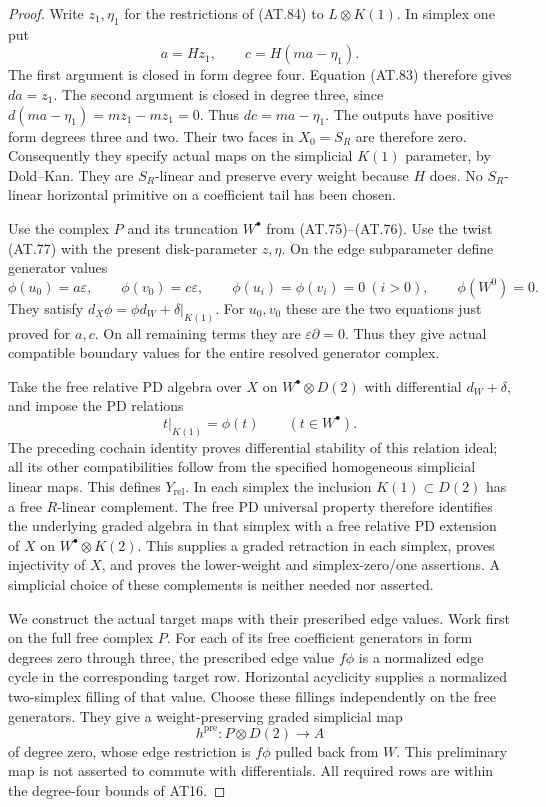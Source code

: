 \begin{proof}
Write $z_1,\eta_1$ for the restrictions of
\textup{(AT.84)} to $L\otimes K(1)$.
In simplex one put
\[
                    a=H z_1,\qquad
                    c=H(ma-\eta_1).
 \tag{AT.85}
\]
The first argument is closed in form degree four.
Equation \textup{(AT.83)} therefore gives $da=z_1$.
The second argument is closed in degree three,
since $d(ma-\eta_1)=mz_1-mz_1=0$.
Thus $dc=ma-\eta_1$.
The outputs have positive form degrees three and two.
Their two faces in $X_0=S_R$ are therefore zero.
Consequently they specify actual maps on the
simplicial $K(1)$ parameter, by Dold--Kan.
They are $S_R$-linear and preserve every weight
because $H$ does. No $S_R$-linear horizontal
primitive on a coefficient tail has been chosen.

Use the complex $P$ and its truncation $W^\bullet$
from \textup{(AT.75)--(AT.76)}.
Use the twist \textup{(AT.77)} with the present
disk-parameter $z,\eta$.
On the edge subparameter define generator values
\[
 \phi(u_0)=a\varepsilon,\qquad
 \phi(v_0)=c\varepsilon,\qquad
 \phi(u_i)=\phi(v_i)=0\ (i>0),\qquad
 \phi(W^0)=0.
 \tag{AT.86}
\]
They satisfy $d_X\phi=\phi d_W+\delta|_{K(1)}$.
For $u_0,v_0$ these are the two equations just
proved for $a,c$. On all remaining terms they
are $\varepsilon\partial=0$.
Thus they give actual compatible boundary values
for the entire resolved generator complex.

Take the free relative PD algebra over $X$ on
$W^\bullet\otimes D(2)$ with differential
$d_W+\delta$, and impose the PD relations
\[
                 t|_{K(1)}=\phi(t)
                   \qquad(t\in W^\bullet).
 \tag{AT.87}
\]
The preceding cochain identity proves differential
stability of this relation ideal; all its other
compatibilities follow from the specified homogeneous
simplicial linear maps.
This defines $Y_{\mathrm{rel}}$.
In each simplex the inclusion $K(1)\subset D(2)$
has a free $R$-linear complement.
The free PD universal property therefore identifies
the underlying graded algebra in that simplex with
a free relative PD extension of $X$ on
$W^\bullet\otimes K(2)$.
This supplies a graded retraction in each simplex,
proves injectivity of $X$, and proves the lower-weight
and simplex-zero/one assertions.
A simplicial choice of these complements is neither
needed nor asserted.

We construct the actual target maps with their
prescribed edge values. Work first on the full
free complex $P$.
For each of its free coefficient generators in
form degrees zero through three, the prescribed
edge value $f\phi$ is a normalized edge cycle
in the corresponding target row.
Horizontal acyclicity supplies a normalized
two-simplex filling of that value.
Choose these fillings independently on the free
generators. They give a weight-preserving graded
simplicial map
\[
 h^{\mathrm{pre}}:P\otimes D(2)\to A
\]
of degree zero, whose edge restriction is
$f\phi$ pulled back from $W$.
This preliminary map is not asserted to commute
with differentials. All required rows are within
the degree-four bounds of AT16.


\end{proof}
